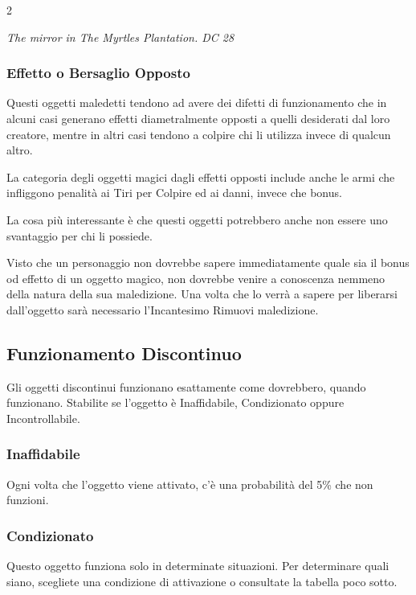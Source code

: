 \begin{multicols}{2}
\begin{center}
\emph{The mirror in The Myrtles Plantation. DC 28}
\end{center}

\subsubsection{Effetto o Bersaglio Opposto}

Questi oggetti maledetti tendono ad avere dei difetti di funzionamento che in alcuni casi generano effetti diametralmente opposti a quelli desiderati dal loro creatore, mentre in altri casi tendono a colpire chi li utilizza invece di qualcun altro.

La categoria degli oggetti magici dagli effetti opposti include anche le armi che infliggono penalità ai Tiri per Colpire ed ai danni, invece che bonus.

La cosa più interessante è che questi oggetti potrebbero anche non essere uno svantaggio per chi li possiede.

Visto che un personaggio non dovrebbe sapere immediatamente quale sia il bonus od effetto di un oggetto magico, non dovrebbe venire a conoscenza nemmeno della natura della sua maledizione. Una volta che lo verrà a sapere per liberarsi dall'oggetto sarà necessario l'Incantesimo Rimuovi maledizione.

\subsection{Funzionamento Discontinuo}

Gli oggetti discontinui funzionano esattamente come dovrebbero, quando funzionano. Stabilite se l'oggetto è Inaffidabile, Condizionato oppure Incontrollabile.

\medskip
\subsubsection{Inaffidabile}

Ogni volta che l'oggetto viene attivato, c'è una probabilità del 5\% che non funzioni.

\subsubsection{Condizionato}

Questo oggetto funziona solo in determinate situazioni. Per determinare quali siano, scegliete una condizione di attivazione o consultate la tabella poco sotto.


\end{multicols}
